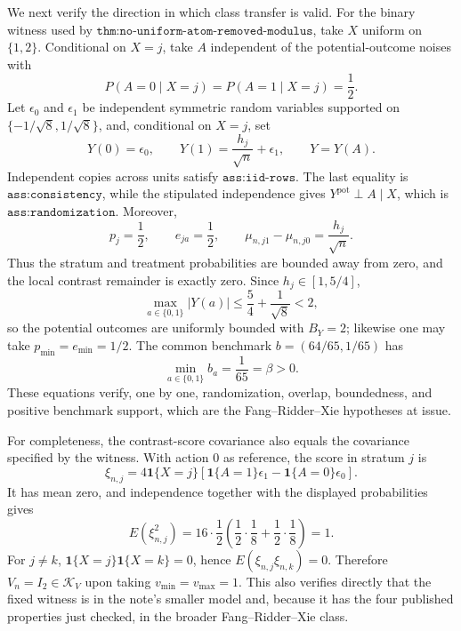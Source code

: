 We next verify the direction in which class transfer is valid.  For the binary witness used by \(\texttt{thm:no-uniform-atom-removed-modulus}\), take \(X\) uniform on \(\{1,2\}\).  Conditional on \(X=j\), take \(A\) independent of the potential-outcome noises with
\[
 P(A=0\mid X=j)=P(A=1\mid X=j)=\frac12.
\]
Let \(\epsilon_0\) and \(\epsilon_1\) be independent symmetric random variables supported on \(\{-1/\sqrt8,1/\sqrt8\}\), and, conditional on \(X=j\), set
\[
 Y(0)=\epsilon_0,
 \qquad
 Y(1)=\frac{h_j}{\sqrt n}+\epsilon_1,
 \qquad
 Y=Y(A).
\]
Independent copies across units satisfy \(\texttt{ass:iid-rows}\).  The last equality is \(\texttt{ass:consistency}\), while the stipulated independence gives \(Y^{\mathrm{pot}}\perp A\mid X\), which is \(\texttt{ass:randomization}\).  Moreover,
\[
 p_j=\frac12,
 \qquad
 e_{ja}=\frac12,
 \qquad
 \mu_{n,j1}-\mu_{n,j0}=\frac{h_j}{\sqrt n}.
\]
Thus the stratum and treatment probabilities are bounded away from zero, and the local contrast remainder is exactly zero.  Since \(h_j\in[1,5/4]\),
\[
 \max_{a\in\{0,1\}}|Y(a)|
 \leq \frac54+\frac1{\sqrt8}<2,
\]
so the potential outcomes are uniformly bounded with \(B_Y=2\); likewise one may take \(p_{\min}=e_{\min}=1/2\).  The common benchmark \(b=(64/65,1/65)\) has
\[
 \min_{a\in\{0,1\}}b_a=\frac1{65}=\beta>0.
\]
These equations verify, one by one, randomization, overlap, boundedness, and positive benchmark support, which are the Fang--Ridder--Xie hypotheses at issue.

For completeness, the contrast-score covariance also equals the covariance specified by the witness.  With action \(0\) as reference, the score in stratum \(j\) is
\[
 \xi_{n,j}
 =4\mathbf 1\{X=j\}
 \left[\mathbf 1\{A=1\}\epsilon_1-
       \mathbf 1\{A=0\}\epsilon_0\right].
\]
It has mean zero, and independence together with the displayed probabilities gives
\[
 E(\xi_{n,j}^2)
 =16\cdot\frac12
 \left(\frac12\cdot\frac18+\frac12\cdot\frac18\right)=1.
\]
For \(j\neq k\), \(\mathbf 1\{X=j\}\mathbf 1\{X=k\}=0\), hence \(E(\xi_{n,j}\xi_{n,k})=0\).  Therefore \(V_n=I_2\in\mathcal K_V\) upon taking \(v_{\min}=v_{\max}=1\).  This also verifies directly that the fixed witness is in the note's smaller model and, because it has the four published properties just checked, in the broader Fang--Ridder--Xie class.

